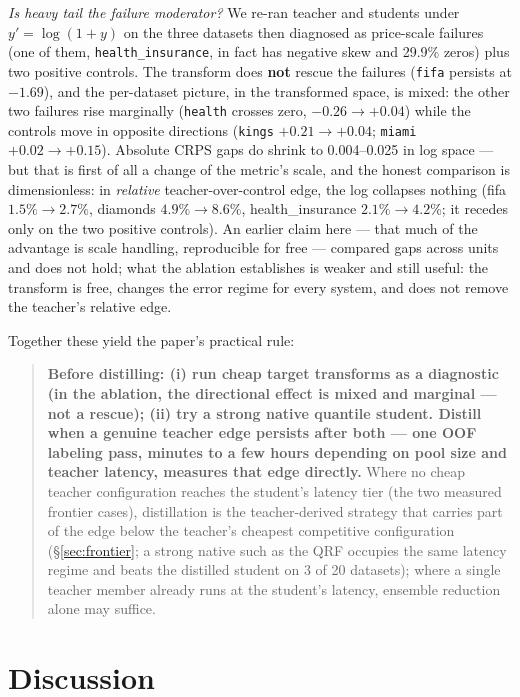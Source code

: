 \documentclass[11pt]{article}
\begin{document}
\emph{Is heavy tail the failure moderator?} We re-ran teacher and students
under $y' = \log(1+y)$ on the three datasets then diagnosed as
price-scale failures (one of them, \texttt{health\_insurance}, in
fact has negative skew and 29.9\% zeros) plus two
positive controls. The transform does \textbf{not} rescue the failures
(\texttt{fifa} persists at $-1.69$), and the per-dataset picture, in
the transformed space, is mixed: the other two failures rise
marginally (\texttt{health} crosses zero, $-0.26 \to +0.04$) while
the controls move in opposite directions
(\texttt{kings} $+0.21 \to +0.04$; \texttt{miami}
$+0.02 \to +0.15$). Absolute CRPS gaps do shrink to
0.004--0.025 in log space --- but that is first of all a change of the
metric's scale, and the honest comparison is dimensionless: in
\emph{relative} teacher-over-control edge, the log collapses nothing
(fifa $1.5\%\!\to\!2.7\%$, diamonds $4.9\%\!\to\!8.6\%$,
health\_insurance $2.1\%\!\to\!4.2\%$; it recedes only on the two
positive controls). An earlier claim here --- that much of the advantage
is scale handling, reproducible for free --- compared gaps across units
and does not hold; what the ablation establishes is weaker and still
useful: the transform is free, changes the error regime for every
system, and does not remove the teacher's relative edge.

Together these yield the paper's practical rule:

\begin{quote}
\textbf{Before distilling: (i) run cheap target transforms as a
diagnostic (in the ablation, the directional effect is mixed and
marginal --- not a rescue); (ii) try a
strong native quantile student. Distill when a genuine teacher edge
persists after both --- one OOF labeling pass, minutes to a few
hours depending on pool size and teacher latency, measures
that edge directly.} Where no cheap teacher configuration reaches
the student's latency tier (the two measured frontier cases),
distillation is the teacher-derived strategy
that carries part of the edge below the teacher's cheapest
competitive
configuration (\S\ref{sec:frontier}; a strong native such as the
QRF occupies the same latency regime and beats the distilled student
on 3 of 20 datasets); where a single teacher member already runs at the
student's latency, ensemble
reduction alone may suffice.
\end{quote}

\section{Discussion}
\end{document}
